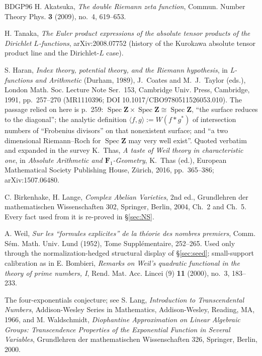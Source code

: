 \documentclass[11pt]{article}
\theoremstyle{definition}
\theoremstyle{remark}
\newcommand{\Z}{\mathbf{Z}}
\newcommand{\Fun}{\mathbf{F}_1}
\newcommand{\SpecZ}{\operatorname{Spec}\Z}
\begin{document}
\begin{thebibliography}{BDGP96}
 H. Akatsuka, \emph{The double Riemann zeta function},
Commun. Number Theory Phys. \textbf{3} (2009), no.~4, 619--653.

 H. Tanaka, \emph{The Euler product expressions of the
absolute tensor products of the Dirichlet $L$-functions},
arXiv:2008.07752 (history of the Kurokawa absolute tensor product line
and the Dirichlet-$L$ case).

 S. Haran, \emph{Index theory, potential theory, and the
Riemann hypothesis}, in \emph{L-functions and Arithmetic} (Durham, 1989),
J.~Coates and M.~J.~Taylor (eds.), London Math. Soc. Lecture Note Ser.\ 153,
Cambridge Univ. Press, Cambridge, 1991, pp.~257--270 (MR1110396; DOI
10.1017/CBO9780511526053.010). The passage relied on here is p.~259:
$\SpecZ \times \SpecZ \cong \SpecZ$, ``the surface reduces to the
diagonal''; the analytic definition $\langle f,g \rangle := W(f * g^{*})$ of
intersection numbers of ``Frobenius divisors'' on that nonexistent surface;
and ``a two dimensional Riemann--Roch for $\SpecZ$ may very well exist''.
Quoted verbatim and expanded in the survey K.~Thas, \emph{A taste of Weil
theory in characteristic one}, in \emph{Absolute Arithmetic and
$\Fun$-Geometry}, K.~Thas (ed.), European Mathematical Society Publishing
House, Z\"urich, 2016, pp.~365--386; arXiv:1507.06480.

 C. Birkenhake, H. Lange, \emph{Complex Abelian Varieties},
2nd ed., Grundlehren der mathematischen Wissenschaften 302, Springer,
Berlin, 2004, Ch.~2 and Ch.~5. Every fact used from it is re-proved in
\S\ref{sec:NS}.

 A. Weil, \emph{Sur les ``formules explicites'' de la
th\'eorie des nombres premiers}, Comm. S\'em. Math. Univ. Lund (1952),
Tome Suppl\'ementaire, 252--265. Used only through the
normalization-hedged structural display of \S\ref{sec:seed}; small-support
calibration as in E. Bombieri, \emph{Remarks on Weil's quadratic functional
in the theory of prime numbers, I}, Rend. Mat. Acc. Lincei (9) \textbf{11}
(2000), no.~3, 183--233.

 The four-exponentials conjecture; see S. Lang,
\emph{Introduction to Transcendental Numbers}, Addison-Wesley Series in
Mathematics, Addison-Wesley, Reading, MA, 1966, and M. Waldschmidt,
\emph{Diophantine Approximation on Linear Algebraic Groups: Transcendence
Properties of the Exponential Function in Several Variables}, Grundlehren
der mathematischen Wissenschaften 326, Springer, Berlin, 2000.


\end{thebibliography}
\end{document}
